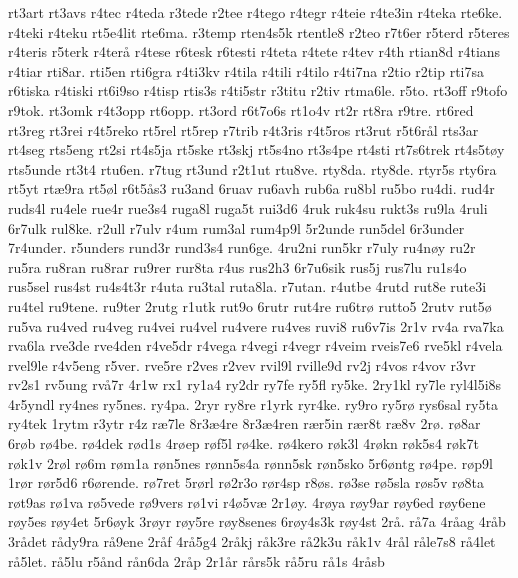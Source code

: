 rt3art
rt3avs
r4tec
r4teda
r3tede
r2tee
r4tego
r4tegr
r4teie
r4te3in
r4teka
rte6ke.
r4teki
r4teku
rt5e4lit
rte6ma.
r3temp
rten4s5k
rtentle8
r2teo
r7t6er
r5terd
r5teres
r4teris
r5terk
r4ter^^e5
r4tese
r6tesk
r6testi
r4teta
r4tete
r4tev
r4th
rtian8d
r4tians
r4tiar
rti8ar.
rti5en
rti6gra
r4ti3kv
r4tila
r4tili
r4tilo
r4ti7na
r2tio
r2tip
rti7sa
r6tiska
r4tiski
rt6i9so
r4tisp
rtis3s
r4ti5str
r3titu
r2tiv
rtma6le.
r5to.
rt3off
r9tofo
r9tok.
rt3omk
r4t3opp
rt6opp.
rt3ord
r6t7o6s
rt1o4v
rt2r
rt8ra
r9tre.
rt6red
rt3reg
rt3rei
r4t5reko
rt5rel
rt5rep
r7trib
r4t3ris
r4t5ros
rt3rut
r5t6r^^e5l
rts3ar
rt4seg
rts5eng
rt2si
rt4s5ja
rt5ske
rt3skj
rt5s4no
rt3s4pe
rt4sti
rt7s6trek
rt4s5t^^f8y
rts5unde
rt3t4
rtu6en.
r7tug
rt3und
r2t1ut
rtu8ve.
rty8da.
rty8de.
rtyr5s
rty6ra
rt5yt
rt^^e69ra
rt5^^f8l
r6t5^^e5s3
ru3and
6ruav
ru6avh
rub6a
ru8bl
ru5bo
ru4di.
rud4r
ruds4l
ru4ele
rue4r
rue3s4
ruga8l
ruga5t
rui3d6
4ruk
ruk4su
rukt3s
ru9la
4ruli
6r7ulk
rul8ke.
r2ull
r7ulv
r4um
rum3al
rum4p9l
5r2unde
run5del
6r3under
7r4under.
r5unders
rund3r
rund3s4
run6ge.
4ru2ni
run5kr
r7uly
ru4n^^f8y
ru2r
ru5ra
ru8ran
ru8rar
ru9rer
rur8ta
r4us
rus2h3
6r7u6sik
rus5j
rus7lu
ru1s4o
rus5sel
rus4st
ru4s4t3r
r4uta
ru3tal
ruta8la.
r7utan.
r4utbe
4rutd
rut8e
rute3i
ru4tel
ru9tene.
ru9ter
2rutg
r1utk
rut9o
6rutr
rut4re
ru6tr^^f8
rutto5
2rutv
rut5^^f8
ru5va
ru4ved
ru4veg
ru4vei
ru4vel
ru4vere
ru4ves
ruvi8
ru6v7is
2r1v
rv4a
rva7ka
rva6la
rve3de
rve4den
r4ve5dr
r4vega
r4vegi
r4vegr
r4veim
rveis7e6
rve5kl
r4vela
rvel9le
r4v5eng
r5ver.
rve5re
r2ves
r2vev
rvil9l
rville9d
rv2j
r4vos
r4vov
r3vr
rv2s1
rv5ung
rv^^e57r
4r1w
rx1
ry1a4
ry2dr
ry7fe
ry5fl
ry5ke.
2ry1kl
ry7le
ryl4l5i8s
4r5yndl
ry4nes
ry5nes.
ry4pa.
2ryr
ry8re
r1yrk
ryr4ke.
ry9ro
ry5r^^f8
rys6sal
ry5ta
ry4tek
1rytm
r3ytr
r4z
r^^e67le
8r3^^e64re
8r3^^e64ren
r^^e6r5in
r^^e6r8t
r^^e68v
2r^^f8.
r^^f88ar
6r^^f8b
r^^f84be.
r^^f84dek
r^^f8d1s
4r^^f8ep
r^^f8f5l
r^^f84ke.
r^^f84kero
r^^f8k3l
4r^^f8kn
r^^f8k5s4
r^^f8k7t
r^^f8k1v
2r^^f8l
r^^f86m
r^^f8m1a
r^^f8n5nes
r^^f8nn5s4a
r^^f8nn5sk
r^^f8n5sko
5r6^^f8ntg
r^^f84pe.
r^^f8p9l
1r^^f8r
r^^f8r5d6
r6^^f8rende.
r^^f87ret
5r^^f8rl
r^^f82r3o
r^^f8r4sp
r8^^f8s.
r^^f83se
r^^f85sla
r^^f8s5v
r^^f88ta
r^^f8t9as
r^^f81va
r^^f85vede
r^^f89vers
r^^f81vi
r4^^f85v^^e6
2r1^^f8y.
4r^^f8ya
r^^f8y9ar
r^^f8y6ed
r^^f8y6ene
r^^f8y5es
r^^f8y4et
5r6^^f8yk
3r^^f8yr
r^^f8y5re
r^^f8y8senes
6r^^f8y4s3k
r^^f8y4st
2r^^e5.
r^^e57a
4r^^e5ag
4r^^e5b
3r^^e5det
r^^e5dy9ra
r^^e59ene
2r^^e5f
4r^^e55g4
2r^^e5kj
r^^e5k3re
r^^e52k3u
r^^e5k1v
4r^^e5l
r^^e5le7s8
r^^e54let
r^^e55let.
r^^e55lu
r5^^e5nd
r^^e5n6da
2r^^e5p
2r1^^e5r
r^^e5rs5k
r^^e55ru
r^^e51s
4r^^e5sb
